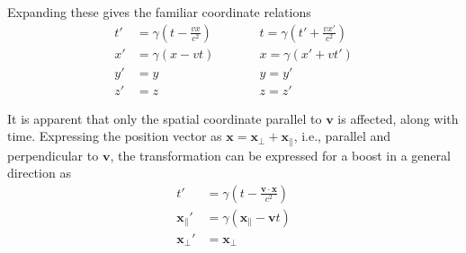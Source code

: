 \documentclass[a4paper]{article}
\begin{document}
Expanding these gives the familiar coordinate relations
\begin{equation} \label{coord-relations}
    \begin{alignedat}{2}
        t' &= \gamma ( t - \frac{vx}{c^2} ) \qquad && t = \gamma ( t' + \frac{vx'}{c^2} ) \\
        x' &= \gamma ( x - vt ) \qquad && x = \gamma ( x' + vt' ) \\
        y' &= y && y = y' \\
        z' &= z && z = z'
    \end{alignedat}
\end{equation}
        
It is apparent that only the spatial coordinate parallel to $\mathbf{v}$ is affected, along with time. Expressing the position vector as $\mathbf{x} = \mathbf{x}_{\perp} + \mathbf{x}_{\parallel}$, i.e., parallel and perpendicular to $\mathbf{v}$, the transformation can be expressed for a boost in a general direction as
\begin{align}
    t' &= \gamma \left( t- \frac{\mathbf{v}\cdot\mathbf{x}}{c^2} \right) \label{time-transform} \\
    \mathbf{x}_{\parallel}' &= \gamma(\mathbf{x}_{\parallel} - \mathbf{v}t) \label{space-transform} \\
    \mathbf{x}_{\perp}' &= \mathbf{x}_{\perp} \label{perp-transform}
\end{align}
\end{document}

